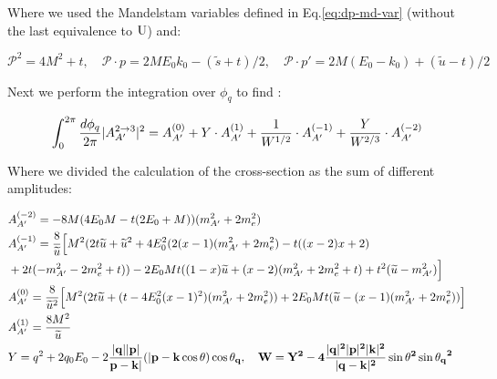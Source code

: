 Where we used the Mandelstam variables defined in Eq.\ref{eq:dp-md-var} (without the last equivalence to $\rm{U}$) and:

\begin{equation}
  \label{eq:dp-md-var-2}
  \mathcal{P}^2 = 4M^2 + t, \quad \mathcal{P} \cdot p = 2 M E_0 k_0 - (\widetilde{s} + t)/2, \quad \mathcal{P} \cdot p' = 2 M (E_0 - k_0) + (\widetilde{u} - t)/2
\end{equation}

Next we perform the integration over $\phi_q$ to find \cite{DMsimulation}:

\begin{equation}
  \label{eq:dp-cs-tl-int}
  \int_0^{2\pi} \frac{d\phi_q}{2\pi} |A^{2 \to 3}_{A'}|^2 = A^{(0)}_{A'} + Y \cdot A^{(1)}_{A'} + \frac{1}{W^{1/2}} \cdot A^{(-1)}_{A'} + \frac{Y}{W^{2/3}} \cdot A^{(-2)}_{A'}
\end{equation}

Where we divided the calculation of the cross-section as the sum of different amplitudes:

\begin{equation}
  \label{eq:dp-cs-tl-par}
  \begin{aligned}
    &A^{(-2)}_{A'} = -8M (4E_0M - t(2E_0 + M ))(m^2_{A'} + 2m^2_e)\\
    &A^{(-1)}_{A'} = \frac{8}{\widetilde{u}} \Big[ M^2 (2t\widetilde{u} + \widetilde{u}^2 + 4E_0^2 (2(x-1)(m^2_{A'} + 2m_e^2) - t((x-2)x + 2)\\
    &+ 2t(-m^2_{A'} - 2m_e^2 + t)) - 2E_0 M t ((1-x)\widetilde{u} + (x-2)(m^2_{A'} + 2m^2_e + t) + t^2 (\widetilde{u} - m^2_{A'}) \Big] \\
    &A^{(0)}_{A'} = \frac{8}{\widetilde{u}^2} \Big[ M^2 (2t\widetilde{u} + (t - 4E_0^2(x-1)^2)(m^2_{A'} + 2m^2_e)) + 2E_0M t (\widetilde{u} - (x-1)(m^2_{A'} + 2m^2_e)) \Big] \\
    &A^{(1)}_{A'} = \frac{8M^2}{\widetilde{u}} \\
    &Y = q^2 + 2q_0 E_0 - 2 \frac{|\bf{q}| |\bf{p}|}{\bf{p} - \bf{k}|} (|\bf{p} - \bf{k} \cos{\theta})\cos{\theta_q}, \quad W = Y^2 - 4 \frac{|\bf{q}|^2|\bf{p}|^2|\bf{k}|^2}{|\bf{q} - \bf{k}|^2} \sin{\theta}^2\sin{\theta_q}^2
  \end{aligned}
\end{equation}

